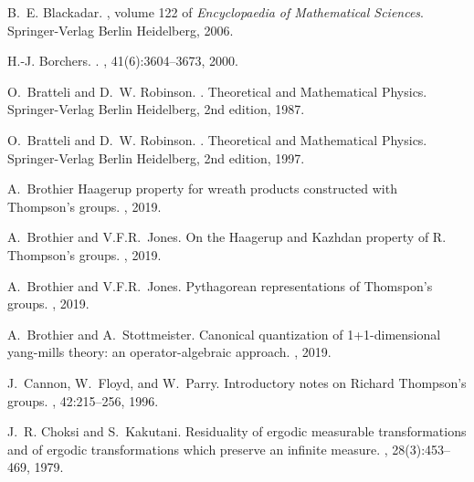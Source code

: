 \documentclass[a4paper,12pt]{amsart}
\numberwithin{equation}{section}
\theoremstyle{definition}
\begin{document}
\begin{thebibliography}{}
B.~E. Blackadar.
, volume 122 of {\em Encyclopaedia of Mathematical Sciences}.
\newblock Springer-Verlag Berlin Heidelberg, 2006.

H.-J. Borchers.
.
, 41(6):3604--3673, 2000.

O.~{B}ratteli and D.~W. {R}obinson.
.
\newblock Theoretical and Mathematical Physics. {S}pringer-{Verlag} {B}erlin
  {H}eidelberg, 2nd edition, 1987.

O.~{B}ratteli and D.~W. {R}obinson.
.
\newblock Theoretical and Mathematical Physics. {S}pringer-{Verlag} {B}erlin
  {H}eidelberg, 2nd edition, 1997.

A.~Brothier
\newblock Haagerup property for wreath products constructed with Thompson's groups.
, 2019.

A.~Brothier and V.F.R.~Jones.
\newblock On the {H}aagerup and {K}azhdan property of {R}. {T}hompson's groups.
, 2019.

A.~Brothier and V.F.R.~Jones.
\newblock Pythagorean representations of {T}homspon's groups.
, 2019.

A.~Brothier and A.~Stottmeister.
\newblock Canonical quantization of 1+1-dimensional yang-mills theory: an
  operator-algebraic approach.
, 2019.

J.~Cannon, W.~Floyd, and W.~Parry.
\newblock Introductory notes on {R}ichard {T}hompson's groups.
, 42:215--256, 1996.

J.~R. Choksi and S.~Kakutani.
\newblock Residuality of ergodic measurable transformations and of ergodic
  transformations which preserve an infinite measure.
, 28(3):453--469, 1979.


\end{thebibliography}
\end{document}
